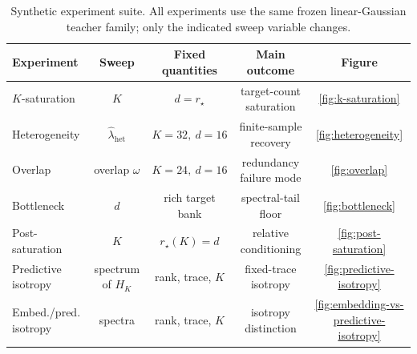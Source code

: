 \begin{table}[t]
\centering
\small
\begin{tabular}{lcccc}
\hline
Experiment & Sweep & Fixed quantities & Main outcome & Figure \\
\hline
$K$-saturation & $K$ & $d=r_\star$ & target-count saturation & \cref{fig:k-saturation} \\
Heterogeneity & $\widehat{\lambda}_{\mathrm{het}}$ & $K=32,\ d=16$ & finite-sample recovery & \cref{fig:heterogeneity} \\
Overlap & overlap $\omega$ & $K=24,\ d=16$ & redundancy failure mode & \cref{fig:overlap} \\
Bottleneck & $d$ & rich target bank & spectral-tail floor & \cref{fig:bottleneck} \\
Post-saturation & $K$ & $r_\star(K)=d$ & relative conditioning & \cref{fig:post-saturation} \\
Predictive isotropy & spectrum of $H_K$ & rank, trace, $K$ & fixed-trace isotropy & \cref{fig:predictive-isotropy} \\
Embed./pred. isotropy & spectra & rank, trace, $K$ & isotropy distinction & \cref{fig:embedding-vs-predictive-isotropy} \\
\hline
\end{tabular}
\caption{Synthetic experiment suite. All experiments use the same frozen
linear-Gaussian teacher family; only the indicated sweep variable changes.}
\label{tab:experiment-summary}
\end{table}

